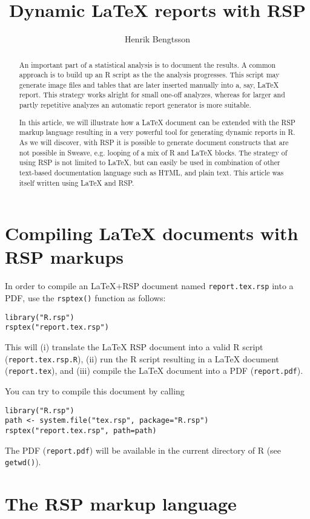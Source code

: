 \documentclass[letter,12pt]{article}
\title{Dynamic LaTeX reports with RSP}
\author{Henrik Bengtsson}
\newcommand{\code}[1]{\texttt{#1}}
\begin{document}
\maketitle
\begin{abstract}
An important part of a statistical analysis is to document the results.  A common approach is to build up an R script as the the analysis progresses.  This script may generate image files and tables that are later inserted manually into a, say, LaTeX report.  This strategy works alright for small one-off analyzes, whereas for larger and partly repetitive analyzes an automatic report generator is more suitable.

In this article, we will illustrate how a LaTeX document can be extended with the RSP markup language resulting in a very powerful tool for generating dynamic reports in R.  
As we will discover, with RSP it is possible to generate document constructs that are not possible in Sweave, e.g. looping of a mix of R and LaTeX blocks.
The strategy of using RSP is not limited to LaTeX, but can easily be used in combination of other text-based documentation language such as HTML, and plain text.
This article was itself written using LaTeX and RSP.
\end{abstract}


\section{Compiling LaTeX documents with RSP markups}
In order to compile an LaTeX+RSP document named \code{report.tex.rsp} into a PDF, use the \code{rsptex()} function as follows:
\begin{verbatim}
library("R.rsp")
rsptex("report.tex.rsp")
\end{verbatim}

This will (i) translate the LaTeX RSP document into a valid R script (\code{report.tex.rsp.R}), (ii) run the R script resulting in a LaTeX document (\code{report.tex}), and (iii) compile the LaTeX document into a PDF (\code{report.pdf}).

You can try to compile this document by calling
\begin{verbatim}
library("R.rsp")
path <- system.file("tex.rsp", package="R.rsp")
rsptex("report.tex.rsp", path=path)
\end{verbatim}
The PDF (\code{report.pdf}) will be available in the current directory of R (see \code{getwd()}).


\section{The RSP markup language}
\end{document}
